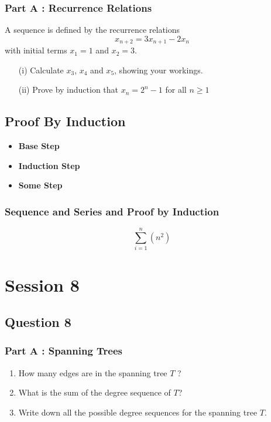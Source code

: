 \documentclass[]{report}
\begin{document}
\subsection*{Part A : Recurrence Relations}
A sequence is defined by the recurrence relations
\[x_{n+2}  = 3x_{n+1} - 2x_n\]
with initial terms $x_1 = 1$ and $x_2=3$.

\begin{itemize}
	\item[(i)] Calculate $x_3$, $x_4$ and $x_5$, showing your workings.
	\item[(ii)] Prove by induction that $x_n = 2^n - 1$ for all $n \geq 1$
\end{itemize}





\section*{Proof By Induction}

\begin{itemize}
	\item \textbf{Base Step}
	\item \textbf{Induction Step}
	\item \textbf{Some Step}
\end{itemize}


\subsection{Sequence and Series and Proof by Induction}


\[\sum^{n}_{i=1} (n^2) \]

\chapter{Session 8}
	\section*{Question 8}
	\subsection*{Part A : Spanning Trees}
	\begin{enumerate}
		\item How many edges are in the spanning tree $T$ ?
		\item What is the sum of the degree sequence of $T$?
		\item Write down all the possible degree sequences for the spanning tree $T$.
	\end{enumerate}
	
\end{document}
